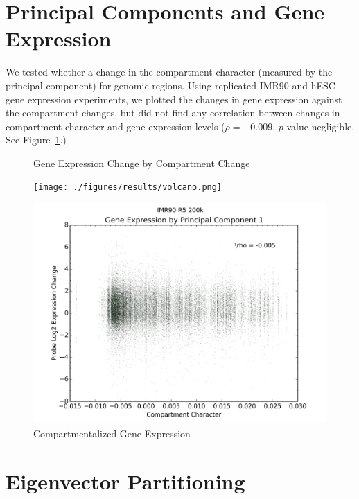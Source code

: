 \section*{Principal Components and Gene Expression}

We tested whether a change in the compartment character (measured by the principal component) for genomic regions.  Using replicated
IMR90 and hESC gene expression experiments, we plotted the changes in gene expression against the compartment changes, but did not
find any correlation between changes in compartment character and gene expression levels ($\rho = -0.009$, $p$-value negligible.
See Figure~\ref{fig:expressionChangeByCompartment}.)

\begin{figure}[thp]
  \begin{minipage}{0.45\textwidth}%
    \centering
    \caption{Gene Expression Change by Compartment Change}\label{fig:expressionChangeByCompartmentChange}
    \texttt{[image: ./figures/results/volcano.png]}
  \end{minipage}

  \begin{minipage}{0.45\textwidth}
    \centering
    \caption{Compartmentalized Gene Expression}\label{fig:expressionChangeByCompartment}
    \includegraphics[width=\textwidth]{./figures/results/compartment_ir5_200k.png}
  \end{minipage}
  \small
\end{figure}

\section*{Eigenvector Partitioning}

